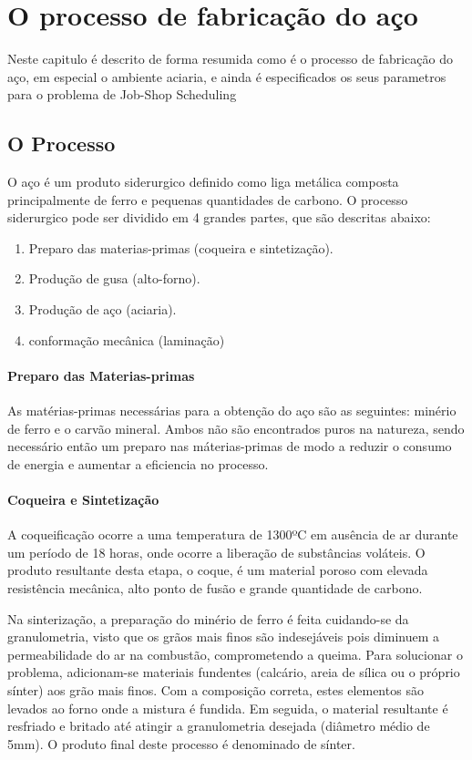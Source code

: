 \chapter{O processo de fabricação do aço}\label{fab_aco}

Neste capitulo é descrito de forma resumida como é o processo de fabricação do aço, em especial o ambiente aciaria, e ainda é especificados os seus parametros para o problema de Job-Shop Scheduling

\section{O Processo}
\cite{UFPR} O aço é um produto siderurgico definido como liga metálica composta principalmente de ferro e pequenas quantidades de carbono. O processo siderurgico pode ser dividido em 4 grandes partes, que são descritas abaixo:
\begin {enumerate}
	\item Preparo das materias-primas (coqueira e sintetização).
	\item Produção de gusa (alto-forno).
	\item Produção de aço (aciaria).
	\item conformação mecânica (laminação)
\end{enumerate}

\subsubsection{Preparo das Materias-primas}
As matérias-primas necessárias para a obtenção do aço são as seguintes: minério de ferro e o carvão mineral. Ambos não são encontrados puros na natureza, sendo necessário então um preparo nas máterias-primas de modo a reduzir o consumo de energia e aumentar a eficiencia no processo.

\subsubsection{Coqueira e Sintetização}
A coqueificação ocorre a uma temperatura de 1300ºC em ausência de ar durante um período de 18 horas, onde ocorre a liberação de substâncias voláteis. O produto resultante desta etapa, o coque, é um material poroso com elevada resistência mecânica, alto ponto de fusão e grande quantidade de carbono.

Na sinterização, a preparação do minério de ferro é feita cuidando-se da granulometria, visto que os grãos mais finos são indesejáveis pois diminuem a permeabilidade do ar na combustão, comprometendo a queima. Para solucionar o problema, adicionam-se materiais fundentes (calcário, areia de sílica ou o próprio sínter) aos grão mais finos.
Com a composição correta, estes elementos são levados ao forno onde a mistura é fundida. Em seguida, o material resultante é resfriado e britado até atingir a granulometria desejada (diâmetro médio de 5mm).
O produto final deste processo é denominado de sínter.

